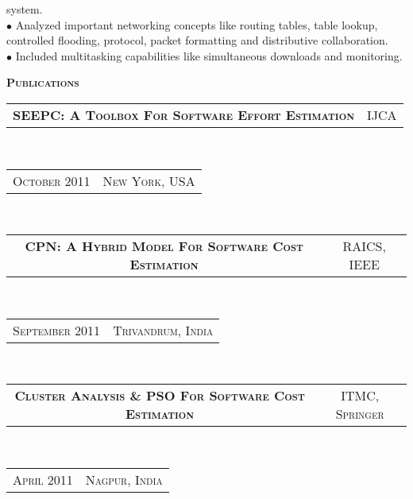 \documentclass[10pt,a4paper,oneside]{article}
\begin{document}
\begin{minipage}[t]{0.63\textwidth}
\begin{adjustwidth}{7pt}{0pt}
{            system.\\
            $\bullet$ Analyzed important networking concepts like routing tables, table lookup, controlled
            flooding, protocol, packet formatting and distributive
            collaboration.\\
            $\bullet$ Included multitasking capabilities like simultaneous
            downloads and monitoring.}\\
        \end{adjustwidth}
        \textcolor{light-gray}{\textbf{\large P\textsc{ublications}}}
        \vspace{10pt}\\
        \begin{tabular}{c|c}
            \textbf{\normalsize SEEPC: A T\textsc{oolbox}
            F\textsc{or} S\textsc{oftware} E\textsc{ffort}
        E\textsc{stimation}}
            &\textmd{\normalsize IJCA}
        \end{tabular}\\
        \textcolor{light-gray}{
            \begin{tabular}{c|c}
                {\small O\textsc{ctober 2011}}
                &{\small N\textsc{ew} Y\textsc{ork}, USA}
            \end{tabular}
        \vspace{10pt}
        }\\ 
        \begin{tabular}{c|c}
            \textbf{\normalsize CPN: A H\textsc{ybrid}
            M\textsc{odel} F\textsc{or} S\textsc{oftware}
        C\textsc{ost} E\textsc{stimation}}
            &\textmd{\normalsize RAICS, IEEE}
        \end{tabular}\\
        \textcolor{light-gray}{
            \begin{tabular}{c|c}
                {\small S\textsc{eptember 2011}}
                &{\small T\textsc{rivandrum}, I\textsc{ndia}}
            \end{tabular}
            \vspace{10pt}
        }\\ 
        \begin{tabular}{c|c}
            \textbf{\normalsize C\textsc{luster} A\textsc{nalysis} \& PSO F\textsc{or} S\textsc{oftware} C\textsc{ost} E\textsc{stimation}}
            &\textmd{\normalsize ITMC, S\textsc{pringer}}
        \end{tabular}\\
        \textcolor{light-gray}{
            \begin{tabular}{c|c}
                {\small A\textsc{pril 2011}}
                &{\small N\textsc{agpur}, I\textsc{ndia}}
            \end{tabular}
        }\\ 
    \end{minipage}
\end{document}
